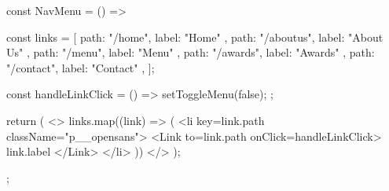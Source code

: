 




const NavMenu = () => {
  const links = [
    { path: "/home", label: "Home" },
    { path: "/aboutus", label: "About Us" },
    { path: "/menu", label: "Menu" },
    { path: "/awards", label: "Awards" },
    { path: "/contact", label: "Contact" },
  ];

  const handleLinkClick = () => {
    setToggleMenu(false);
  };

  return (
    <>
      {links.map((link) => (
        <li key={link.path} className="p__opensans">
          <Link to={link.path} onClick={handleLinkClick}>
            {link.label}
          </Link>
        </li>
      ))}
    </>
  );
};